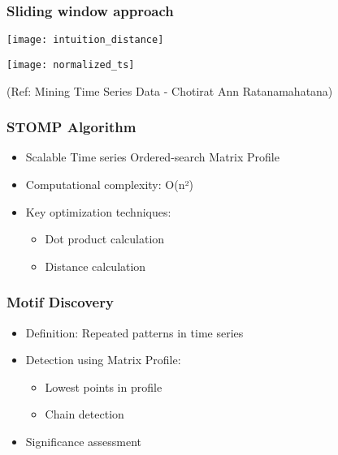 \begin{frame}[fragile]\frametitle{Sliding window approach}
	
      \begin{center}
        \texttt{[image: intuition\_distance]}

        \texttt{[image: normalized\_ts]}

		{\tiny (Ref: Mining Time Series Data - Chotirat Ann Ratanamahatana)}		
        \end{center}
	
\end{frame}


\begin{frame}[fragile]\frametitle{STOMP Algorithm}
    \begin{itemize}
        \item Scalable Time series Ordered-search Matrix Profile
        \item Computational complexity: O(n²)
        \item Key optimization techniques:
            \begin{itemize}
                \item Dot product calculation
                \item Distance calculation
            \end{itemize}
    \end{itemize}
\end{frame}

\begin{frame}[fragile]\frametitle{Motif Discovery}
    \begin{itemize}
        \item Definition: Repeated patterns in time series
        \item Detection using Matrix Profile:
            \begin{itemize}
                \item Lowest points in profile
                \item Chain detection
            \end{itemize}
        \item Significance assessment
    \end{itemize}
	

\end{frame}

